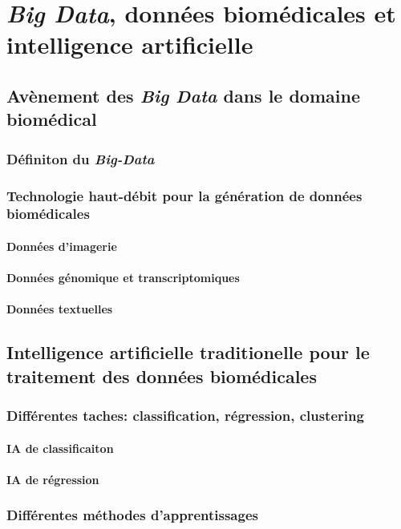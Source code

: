 \chapter{ \textit{Big Data}, données biomédicales et intelligence artificielle}
\section{Avènement des \textit{Big Data} dans le domaine biomédical}
\subsection{Définiton du \textit{Big-Data}}
\subsection{Technologie haut-débit pour la génération de données biomédicales}
\subsubsection{Données d'imagerie}
\subsubsection{Données génomique et transcriptomiques}
\subsubsection{Données textuelles}
\section{Intelligence artificielle traditionelle pour le traitement des données biomédicales}
\subsection{Différentes taches: classification, régression, clustering}
\subsubsection{IA de classificaiton}
\subsubsection{IA de régression}
\subsection{Différentes méthodes d'apprentissages}
